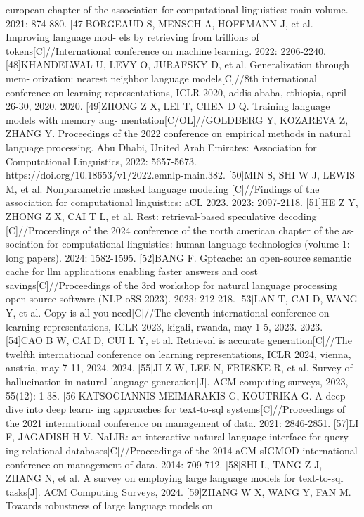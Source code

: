 \documentclass[12pt,a4paper,openright,UTF8]{ctexbook}
\begin{document}
european chapter of the association for computational linguistics: main volume.
2021: 874-880.
[47]BORGEAUD S, MENSCH A, HOFFMANN J, et al. Improving language mod-
els by retrieving from trillions of tokens[C]//International conference on machine
learning. 2022: 2206-2240.
[48]KHANDELWAL U, LEVY O, JURAFSKY D, et al. Generalization through mem-
orization: nearest neighbor language models[C]//8th international conference on
learning representations, ICLR 2020, addis ababa, ethiopia, april 26-30, 2020.
2020.
[49]ZHONG Z X, LEI T, CHEN D Q. Training language models with memory aug-
mentation[C/OL]//GOLDBERG Y, KOZAREVA Z, ZHANG Y. Proceedings of
the 2022 conference on empirical methods in natural language processing. Abu
Dhabi, United Arab Emirates: Association for Computational Linguistics, 2022:
5657-5673. https://doi.org/10.18653/v1/2022.emnlp-main.382.
[50]MIN S, SHI W J, LEWIS M, et al. Nonparametric masked language modeling
[C]//Findings of the association for computational linguistics: aCL 2023. 2023:
2097-2118.
[51]HE Z Y, ZHONG Z X, CAI T L, et al. Rest: retrieval-based speculative decoding
[C]//Proceedings of the 2024 conference of the north american chapter of the as-
sociation for computational linguistics: human language technologies (volume 1:
long papers). 2024: 1582-1595.
[52]BANG F. Gptcache: an open-source semantic cache for llm applications enabling
faster answers and cost savings[C]//Proceedings of the 3rd workshop for natural
language processing open source software (NLP-oSS 2023). 2023: 212-218.
[53]LAN T, CAI D, WANG Y, et al. Copy is all you need[C]//The eleventh international
conference on learning representations, ICLR 2023, kigali, rwanda, may 1-5, 2023.
2023.
[54]CAO B W, CAI D, CUI L Y, et al. Retrieval is accurate generation[C]//The twelfth
international conference on learning representations, ICLR 2024, vienna, austria,
may 7-11, 2024. 2024.
[55]JI Z W, LEE N, FRIESKE R, et al. Survey of hallucination in natural language
generation[J]. ACM computing surveys, 2023, 55(12): 1-38.
[56]KATSOGIANNIS-MEIMARAKIS G, KOUTRIKA G. A deep dive into deep learn-
ing approaches for text-to-sql systems[C]//Proceedings of the 2021 international
conference on management of data. 2021: 2846-2851.
[57]LI F, JAGADISH H V. NaLIR: an interactive natural language interface for query-
ing relational databases[C]//Proceedings of the 2014 aCM sIGMOD international
conference on management of data. 2014: 709-712.
[58]SHI L, TANG Z J, ZHANG N, et al. A survey on employing large language models
for text-to-sql tasks[J]. ACM Computing Surveys, 2024.
[59]ZHANG W X, WANG Y, FAN M. Towards robustness of large language models on
\end{document}
